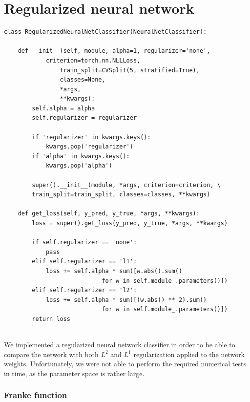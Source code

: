 \documentclass[a4paper, oneside, article]{memoir}
\begin{document}
\chapter{Regularized neural network}
	\begin{listing}
	\begin{verbatim}
class RegularizedNeuralNetClassifier(NeuralNetClassifier):

    def __init__(self, module, alpha=1, regularizer='none', 
    		criterion=torch.nn.NLLLoss,
                train_split=CVSplit(5, stratified=True),
                classes=None,
                *args,
                **kwargs):
        self.alpha = alpha
        self.regularizer = regularizer

        if 'regularizer' in kwargs.keys():
            kwargs.pop('regularizer')
        if 'alpha' in kwargs.keys():
            kwargs.pop('alpha')

        super().__init__(module, *args, criterion=criterion, \
		train_split=train_split, classes=classes, **kwargs)

    def get_loss(self, y_pred, y_true, *args, **kwargs):
        loss = super().get_loss(y_pred, y_true, *args, **kwargs)

        if self.regularizer == 'none':
            pass
        elif self.regularizer == 'l1':
            loss += self.alpha * sum([w.abs().sum() 
	    					for w in self.module_.parameters()])
        elif self.regularizer == 'l2':
            loss += self.alpha * sum([(w.abs() ** 2).sum() 
	    					for w in self.module_.parameters()])
        return loss
		
	\end{verbatim}	
	\caption{We implemented a regularized neural network classifier in
	order to be able to compare the network with both \( L^2 \) and \( L^1
	\) regularization applied to the network weights. Unfortunately, we were not
	able to perform the required numerical tests in time, as the parameter space is
	rather large.}
	\label{lst:rnnc}
	\end{listing}

	\subsection{Franke function}
\end{document}
